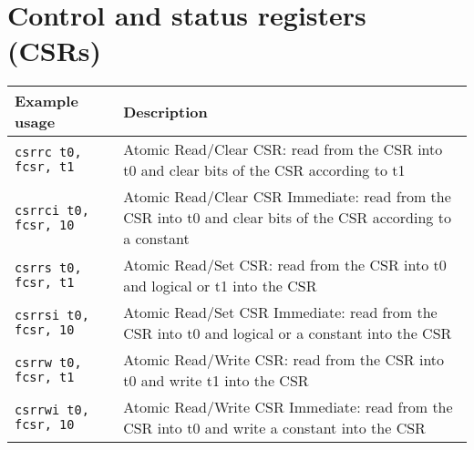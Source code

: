 \section*{Control and status registers (CSRs)}
\small

\begin{multicols}{2}
    
\newcommand{\tabWidth}{0.31\textwidth}
\begin{tabular}{|l|l|}
    \hline
    \textbf{Example usage} & \textbf{Description} \\
    \hline
    \multirow{3}{*}{\texttt{csrrc t0, fcsr, t1}}   & \multirow{3}{\tabWidth}{Atomic Read/Clear CSR: read from the CSR into t0 and clear bits of the CSR according to t1}\\
    &\\
    &\\
    \hline
    \multirow{3}{*}{\texttt{csrrci t0, fcsr, 10} } & \multirow{3}{\tabWidth}{Atomic Read/Clear CSR Immediate: read from the CSR into t0 and clear bits of the CSR according to a constant}\\
    &\\
    &\\
    \hline
    \multirow{3}{*}{\texttt{csrrs t0, fcsr, t1} }  & \multirow{3}{\tabWidth}{Atomic Read/Set CSR: read from the CSR into t0 and logical or t1 into the CSR                                }\\
    &\\
    &\\
    \hline
    \multirow{3}{*}{\texttt{csrrsi t0, fcsr, 10} } & \multirow{3}{\tabWidth}{Atomic Read/Set CSR Immediate: read from the CSR into t0 and logical or a constant into the CSR              }\\
    &\\
    &\\
    \hline
    \multirow{3}{*}{\texttt{csrrw t0, fcsr, t1} }  & \multirow{3}{\tabWidth}{Atomic Read/Write CSR: read from the CSR into t0 and write t1 into the CSR                                   }\\
    &\\
    &\\
    \hline
    \multirow{3}{*}{\texttt{csrrwi t0, fcsr, 10} } & \multirow{3}{\tabWidth}{Atomic Read/Write CSR Immediate: read from the CSR into t0 and write a constant into the CSR                 }\\
    &\\
    &\\
    \hline
\end{tabular}


\end{multicols}

